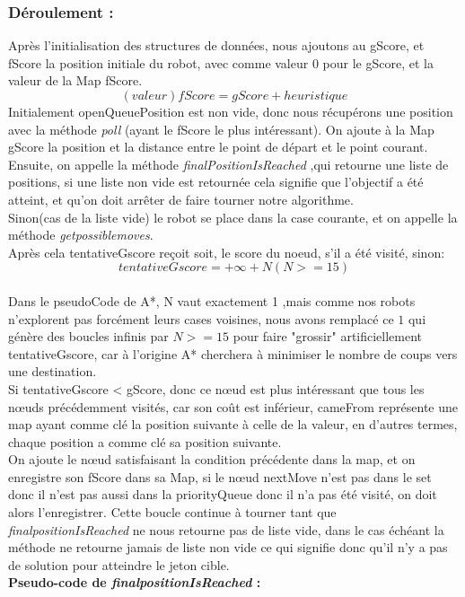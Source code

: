 \documentclass[12pt, a4paper, openany]{article}
\newcommand{\methodename}[1]{\textit{#1}}
\begin{document}
\subsubsection{Déroulement :}
Après l'initialisation des structures de données, nous ajoutons au gScore, et fScore la position initiale du robot, avec comme  valeur 0 pour le gScore, et la valeur de la Map fScore.
\begin{equation}(valeur) fScore=gScore+heuristique\end{equation}
Initialement openQueuePosition est non vide, donc nous récupérons une position avec la méthode \methodename{poll} (ayant le fScore le plus intéressant).
On ajoute à la Map gScore la position et la distance entre le point de départ et le point courant.
\\Ensuite, on appelle la méthode \methodename{finalPositionIsReached} ,qui retourne une liste de positions, si une liste non vide est retournée cela signifie que l'objectif a été atteint, et qu'on doit arrêter de faire tourner notre algorithme.
\\Sinon(cas de la liste vide) le robot se place dans la case courante, et on appelle la méthode \methodename{getpossiblemoves}.
\\Après cela tentativeGscore reçoit soit, le score du noeud, s'il a été visité, sinon: \begin{equation} tentativeGscore=+\infty +N (N>=15) \end{equation}
\\ Dans le pseudoCode de A*, N vaut exactement 1 ,mais comme nos robots n'explorent pas forcément leurs cases voisines, nous avons remplacé ce $1$ qui génère des boucles infinis par $N>=15$ pour faire "grossir" artificiellement tentativeGscore, car à l'origine A* cherchera à minimiser le nombre de coups vers une destination.
\\Si tentativeGscore < gScore, donc ce nœud est plus intéressant que tous les nœuds précédemment visités, car son coût est inférieur, cameFrom représente une map ayant comme clé la position suivante à celle de la valeur, en d'autres termes, chaque position a comme clé sa position suivante.
\\On ajoute le nœud satisfaisant la condition précédente dans la map, et on enregistre son fScore dans sa Map, si le nœud nextMove n'est pas dans le set donc il n'est pas aussi dans la priorityQueue donc il n'a pas été visité, on doit alors l'enregistrer.
Cette boucle continue à tourner tant que \methodename{finalpositionIsReached} ne nous retourne pas de liste vide, dans le cas échéant la méthode ne retourne jamais de liste non vide ce qui signifie donc qu'il n'y a pas de solution pour atteindre le jeton cible.\\
\textbf{Pseudo-code de \methodename{finalpositionIsReached} :}
\end{document}
